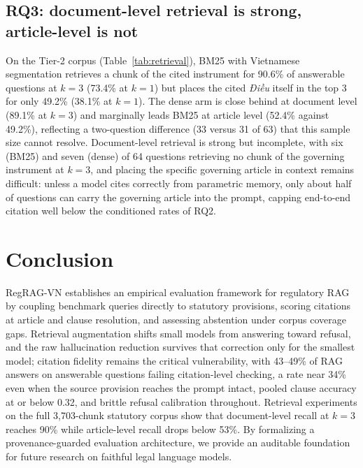 \documentclass[conference,a4paper]{IEEEtran}
\begin{document}
\subsection{RQ3: document-level retrieval is strong, article-level is not}
On the Tier-2 corpus (Table~\ref{tab:retrieval}), BM25 with Vietnamese segmentation retrieves a chunk of the cited instrument for 90.6\% of answerable questions at $k{=}3$ (73.4\% at $k{=}1$) but places the cited \emph{Điều} itself in the top 3 for only 49.2\% (38.1\% at $k{=}1$). The dense arm is close behind at document level (89.1\% at $k{=}3$) and marginally leads BM25 at article level (52.4\% against 49.2\%), reflecting a two-question difference (33 versus 31 of 63) that this sample size cannot resolve. Document-level retrieval is strong but incomplete, with six (BM25) and seven (dense) of 64 questions retrieving no chunk of the governing instrument at $k{=}3$, and placing the specific governing article in context remains difficult: unless a model cites correctly from parametric memory, only about half of questions can carry the governing article into the prompt, capping end-to-end citation well below the conditioned rates of RQ2.


\section{Conclusion}
\label{sec:conclusion}
RegRAG-VN establishes an empirical evaluation framework for regulatory RAG by coupling benchmark queries directly to statutory provisions, scoring citations at article and clause resolution, and assessing abstention under corpus coverage gaps. Retrieval augmentation shifts small models from answering toward refusal, and the raw hallucination reduction survives that correction only for the smallest model; citation fidelity remains the critical vulnerability, with 43--49\% of RAG answers on answerable questions failing citation-level checking, a rate near 34\% even when the source provision reaches the prompt intact, pooled clause accuracy at or below 0.32, and brittle refusal calibration throughout. Retrieval experiments on the full 3,703-chunk statutory corpus show that document-level recall at $k{=}3$ reaches 90\% while article-level recall drops below 53\%. By formalizing a provenance-guarded evaluation architecture, we provide an auditable foundation for future research on faithful legal language models.
\end{document}
